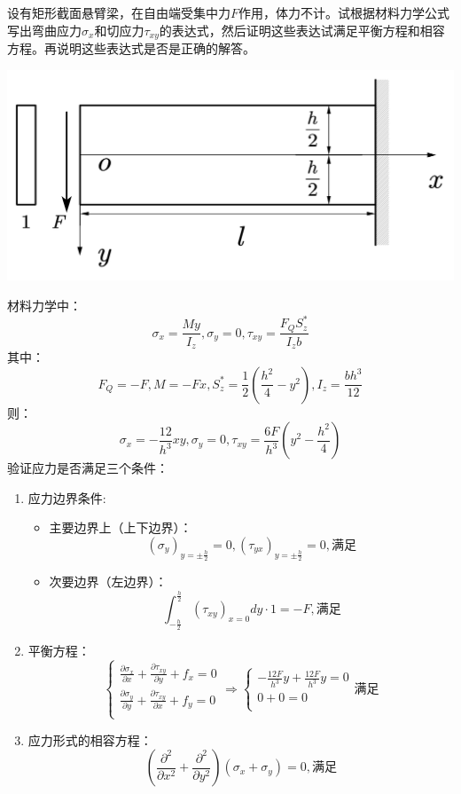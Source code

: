 \begin{example}
	设有矩形截面悬臂梁，在自由端受集中力$F$作用，体力不计。试根据材料力学公式写出弯曲应力$\sigma _x$和切应力$\tau _{xy}$的表达式，然后证明这些表达试满足平衡方程和相容方程。再说明这些表达式是否是正确的解答。
\end{example}
\centerline{\includegraphics[scale=0.5]{figure/2-12.png}}
	\begin{remark}
		材料力学中：\[\sigma _x=\frac{My}{I_z},\sigma _y=0,\tau _{xy}=\frac{F_QS_{z}^{*}}{I_zb}\]
		其中：\[F_Q=-F,M=-Fx,S_{z}^{*}=\frac{1}{2}\left( \frac{h^2}{4}-y^2 \right) ,I_z=\frac{bh^3}{12}\]
		则：\[\sigma _x=-\frac{12}{h^3}xy,\sigma _y=0,\tau _{xy}=\frac{6F}{h^3}\left( y^2-\frac{h^2}{4} \right) \]
		验证应力是否满足三个条件：
		\begin{enumerate}
			\item 应力边界条件:
			\begin{itemize}
				\item 主要边界上（上下边界）：\[\left( \sigma _y \right) _{y=\pm \frac{h}{2}}=0,\left( \tau _{yx} \right) _{y=\pm \frac{h}{2}}=0,\text{满足}\]
				\item 次要边界（左边界）：\[\int_{-\frac{h}{2}}^{\frac{h}{2}}{\left( \tau _{xy} \right) _{x=0}dy\cdot 1=-F,\text{满足}}\]
			\end{itemize}
			\item 平衡方程：\[\begin{cases}
			\frac{\partial \sigma _x}{\partial x}+\frac{\partial \tau _{xy}}{\partial y}+f_x=0\\
			\frac{\partial \sigma _y}{\partial y}+\frac{\partial \tau _{xy}}{\partial x}+f_y=0\\
			\end{cases}\Longrightarrow \begin{cases}
			-\frac{12F}{h^3}y+\frac{12F}{h^3}y=0\\
			0+0=0\\
			\end{cases}\text{满足}\]
			\item 应力形式的相容方程：\[\left( \frac{\partial ^2}{\partial x^2}+\frac{\partial ^2}{\partial y^2} \right) \left( \sigma _x+\sigma _y \right) =0,\text{满足}\]
		\end{enumerate}
		
	\end{remark}

